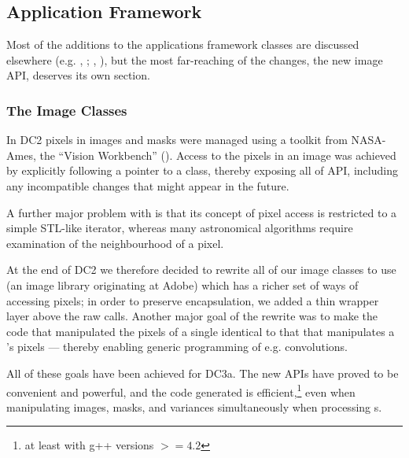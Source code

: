 \subsection{Application Framework}

Most of the additions to the applications framework
classes are discussed elsewhere (e.g. , ; , ),
but the most far-reaching of the changes, the new image API, deserves its own section.

\subsubsection{The Image Classes}
\label{secImageClasses}

In DC2 pixels in images and masks were managed using a toolkit from NASA-Ames, the ``Vision Workbench'' ().
Access to the pixels in an image was achieved by explicitly following a pointer to a  class,
thereby exposing all of  API, including any incompatible changes that might appear in
the future.

A further major problem with  is that its concept of pixel access is restricted to a simple
STL-like iterator, whereas many astronomical algorithms require examination of the neighbourhood of
a pixel.

At the end of DC2 we therefore decided to rewrite all of our image classes to use 
(an image library originating at Adobe) which has a richer set of ways of accessing pixels;  in
order to preserve encapsulation, we added a thin wrapper layer above the raw  calls.
Another major goal of the rewrite was to make the code that manipulated the pixels of a single
 identical to that that manipulates a 's pixels --- thereby enabling
generic programming of e.g. convolutions.

All of these goals have been achieved for DC3a.  The new APIs have proved to be convenient and
powerful, and the code generated is efficient,\footnote{at least with g++ versions $>= 4.2$} even when
manipulating images, masks, and variances simultaneously when processing s.

